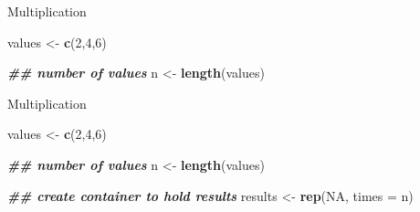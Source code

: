\documentclass[
  ignorenonframetext,
]{beamer}
\newenvironment{Shaded}{\begin{snugshade}}{\end{snugshade}}
\newcommand{\AttributeTok}[1]{\textcolor[rgb]{0.13,0.29,0.53}{#1}}
\newcommand{\ConstantTok}[1]{\textcolor[rgb]{0.56,0.35,0.01}{#1}}
\newcommand{\DecValTok}[1]{\textcolor[rgb]{0.00,0.00,0.81}{#1}}
\newcommand{\DocumentationTok}[1]{\textcolor[rgb]{0.56,0.35,0.01}{\textbf{\textit{#1}}}}
\newcommand{\FunctionTok}[1]{\textcolor[rgb]{0.13,0.29,0.53}{\textbf{#1}}}
\newcommand{\NormalTok}[1]{#1}
\newcommand{\OtherTok}[1]{\textcolor[rgb]{0.56,0.35,0.01}{#1}}
\begin{document}
\begin{frame}[fragile,t]{Multiplication}
\label{multiplication-2}
\footnotesize

\begin{Shaded}
\begin{Highlighting}[]
\NormalTok{values }\OtherTok{\textless{}{-}} \FunctionTok{c}\NormalTok{(}\DecValTok{2}\NormalTok{,}\DecValTok{4}\NormalTok{,}\DecValTok{6}\NormalTok{)}

\DocumentationTok{\#\# number of values}
\NormalTok{n }\OtherTok{\textless{}{-}} \FunctionTok{length}\NormalTok{(values)}
\end{Highlighting}
\end{Shaded}
\end{frame}

\begin{frame}[fragile,t]{Multiplication}
\label{multiplication-3}
\footnotesize

\begin{Shaded}
\begin{Highlighting}[]
\NormalTok{values }\OtherTok{\textless{}{-}} \FunctionTok{c}\NormalTok{(}\DecValTok{2}\NormalTok{,}\DecValTok{4}\NormalTok{,}\DecValTok{6}\NormalTok{)}

\DocumentationTok{\#\# number of values}
\NormalTok{n }\OtherTok{\textless{}{-}} \FunctionTok{length}\NormalTok{(values)}

\DocumentationTok{\#\# create container to hold results}
\NormalTok{results }\OtherTok{\textless{}{-}} \FunctionTok{rep}\NormalTok{(}\ConstantTok{NA}\NormalTok{, }\AttributeTok{times =}\NormalTok{ n)}
\end{Highlighting}
\end{Shaded}
\end{frame}
\end{document}
